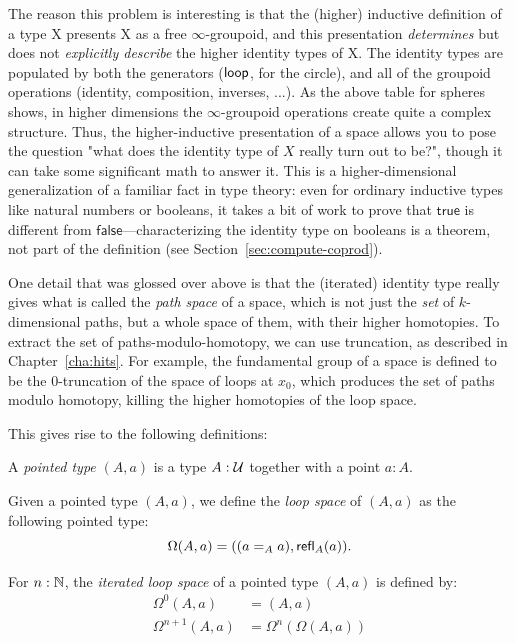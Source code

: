 The reason this problem is interesting is that the (higher) inductive
definition of a type X presents X as a free $\infty$-groupoid, and this
presentation \emph{determines} but does not \emph{explicitly describe}
the higher identity types of X.  The identity types are populated by
both the generators ($\mathsf{loop}$, for the circle), and all of the groupoid
operations (identity, composition, inverses, ...).  As the above table
for spheres shows, in higher dimensions the $\infty$-groupoid operations
create quite a complex structure.  Thus, the higher-inductive
presentation of a space allows you to pose the question "what does the
identity type of $X$ really turn out to be?", though it can take some
significant math to answer it.  This is a higher-dimensional
generalization of a familiar fact in type theory: even for ordinary
inductive types like natural numbers or booleans, it takes a bit of work
to prove that $\mathsf{true}$ is different from $\mathsf{false}$---characterizing the
identity type on booleans is a theorem, not part of the definition
(see Section~\ref{sec:compute-coprod}).

One detail that was glossed over above is that the (iterated) identity
type really gives what is called the \emph{path space} of a space, which
is not just the \emph{set} of $k$-dimensional paths, but a whole space
of them, with their higher homotopies.  To extract the set of
paths-modulo-homotopy, we can use truncation, as described in
Chapter~\ref{cha:hits}.  For example, the fundamental group of a
space is defined to be the 0-truncation of the space of loops at $x_0$,
which produces the set of paths modulo homotopy, killing the higher
homotopies of the loop space.

This gives rise to the following definitions:

\begin{defn}
  A \emph{pointed type} $(A,a)$ is a type $A:\mathcal{U}$ together with a point $a:A$.
\end{defn}

\begin{defn}
  Given a pointed type $(A,a)$, we define the \emph{loop space} of $(A,a)$ as
  the following pointed type:
  \[\Omega(A,a)=((a=_Aa),\mathsf{refl}_{A}(a)).\]

  For $n:\mathbb{N}$, the \emph{iterated loop space} of a pointed type $(A,a)$ is
  defined by:
  \begin{align*}
    \Omega^0(A,a)&=(A,a)\\
    \Omega^{n+1}(A,a)&=\Omega^n(\Omega(A,a))
  \end{align*}
\end{defn}

